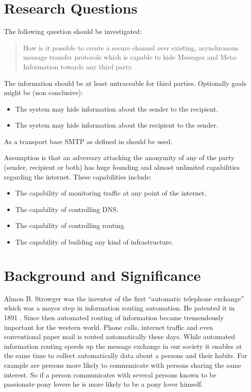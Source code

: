\documentclass[twocolumn,a4paper,10pt,english]{article}
\newenvironment{myitemize}{\begin{itemize}\setlength{\itemsep}{0em}}{\end{itemize}}
\begin{document}
\section{Research Questions}
The following question should be investigated: 
\begin{quote}
How is it possible to create a secure channel over existing, asynchronous message transfer protocols which is capable to hide Messages and Meta-Information towards any third party. 
\end{quote}
The information should be at least untraceable for third parties. Optionally goals might be (non conclusive):
\begin{myitemize}
\item The system may hide information about the sender to the recipient.
\item The system may hide information about the recipient to the sender. 
\end{myitemize}
As a transport base SMTP as defined in \cite{RFC5321} should be used. \par
Assumption is that an adversary attacking the anonymity of any of the party (sender, recipient or both) has huge founding and almost unlimited capabilities regarding the internet. These capabilities include:
\begin{myitemize}
\item The capability of monitoring traffic at any point of the internet.
\item The capability of controlling DNS.
\item The capability of controlling routing.
\item The capability of building any kind of infrastructure.
\end{myitemize}

\section{Background and Significance}
Almon B. Strowger was the inventor of the first ``automatic telephone exchange'' which was a mayor step in information routing automation. He patented it in 1891 \cite{strowger}. Since then automated routing of information became tremendously important for the western world. Phone calls, internet traffic and even conventional paper mail is routed automatically these days. While automated information routing speeds up the message exchange in our society it enables at the same time to collect automatically data about a persons and their habits. For example are persons more likely to communicate with persons sharing the same interest. So if a person communicates with several persons known to be passionate pony lovers he is more likely to be a pony lover himself.\par
\end{document}
